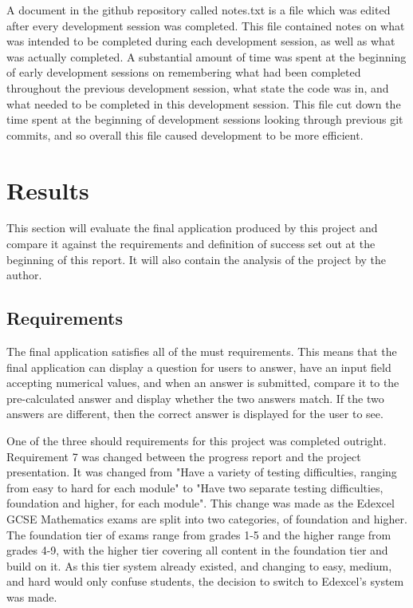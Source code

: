 \documentclass{article}
\begin{document}
A document in the github repository called notes.txt is a file which was edited after every development session was completed. This file contained notes on what was intended to be completed during each development session, as well as what was actually completed. A substantial amount of time was spent at the beginning of early development sessions on remembering what had been completed throughout the previous development session, what state the code was in, and what needed to be completed in this development session. This file cut down the time spent at the beginning of development sessions looking through previous git commits, and so overall this file caused development to be more efficient. \par




\section{Results}
\label{section:results}

This section will evaluate the final application produced by this project and compare it against the requirements and definition of success set out at the beginning of this report. It will also contain the analysis of the project by the author. 

\subsection{Requirements}

The final application satisfies all of the must requirements. This means that the final application can display a question for users to answer, have an input field accepting numerical values, and when an answer is submitted, compare it to the pre-calculated answer and display whether the two answers match. If the two answers are different, then the correct answer is displayed for the user to see. \par

One of the three should requirements for this project was completed outright. Requirement 7 was changed between the progress report and the project presentation. It was changed from "Have a variety of testing difficulties, ranging from easy to hard for each module" to "Have two separate testing difficulties, foundation and higher, for each module". This change was made as the Edexcel GCSE Mathematics exams are split into two categories, of foundation and higher. The foundation tier of exams range from grades 1-5 and the higher range from grades 4-9, with the higher tier covering all content in the foundation tier and build on it. As this tier system already existed, and changing to easy, medium, and hard would only confuse students, the decision to switch to Edexcel's system was made. \par
\end{document}
